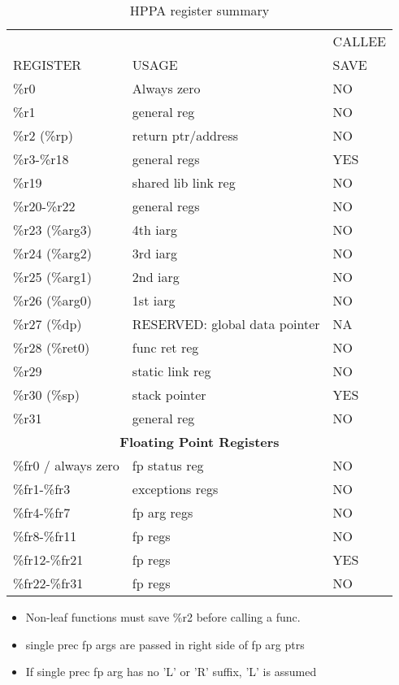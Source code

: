 \documentclass[11pt]{article}
\begin{document}
\begin{table}[hbt]
\begin{center}
\begin{tabular}{||l|l|l||}\hline\hline
         &       & CALLEE\\
REGISTER & USAGE & SAVE\\\hline\hline
\%r0 & Always zero& NO \\\hline
\%r1 & general reg & NO \\\hline
\%r2 (\%rp) & return ptr/address & NO \\\hline
\%r3-\%r18 & general regs & YES \\\hline
\%r19      & shared lib link reg & NO \\\hline
\%r20-\%r22& general regs & NO \\\hline
\%r23 (\%arg3) & 4th iarg & NO  \\\hline
\%r24 (\%arg2) & 3rd iarg & NO  \\\hline
\%r25 (\%arg1) & 2nd iarg & NO  \\\hline
\%r26 (\%arg0) & 1st iarg & NO  \\\hline
\%r27 (\%dp)   & RESERVED: global data pointer & NA \\\hline
\%r28 (\%ret0)  & func ret reg & NO\\\hline
\%r29   & static link reg & NO\\\hline
\%r30 (\%sp)   & stack pointer & YES\\\hline
\%r31          & general reg & NO\\\hline\hline
\multicolumn{3}{||c||}{\bf Floating Point Registers} \\\hline\hline
\%fr0 / always zero   & fp status reg & NO  \\\hline
\%fr1-\%fr3  & exceptions regs & NO \\\hline
\%fr4-\%fr7  & fp arg regs & NO \\\hline
\%fr8-\%fr11 & fp regs     & NO \\\hline
\%fr12-\%fr21 & fp regs   & YES  \\\hline
\%fr22-\%fr31 & fp regs   & NO  \\\hline\hline
\end{tabular}
\end{center}
\caption{HPPA register summary\label{tab-hppa-iregs}}
\end{table}

\begin{itemize}
\item Non-leaf functions must save \%r2 before calling a func.
\item single prec fp args are passed in right side of fp arg ptrs
\item If single prec fp arg has no 'L' or 'R' suffix, 'L' is assumed
\end{itemize}
\end{document}
